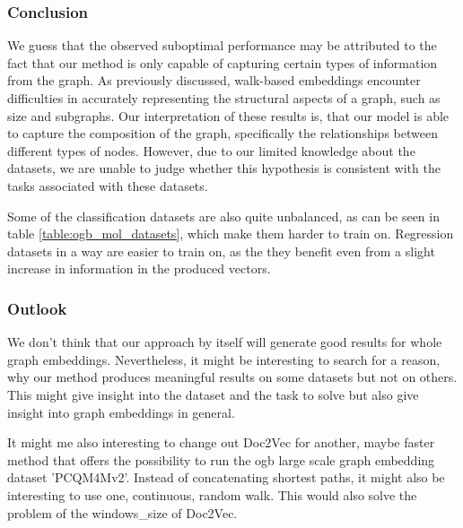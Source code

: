 \subsubsection{Conclusion}
We guess that the observed suboptimal performance may be attributed to the fact that our method is only capable of capturing certain types of information from the graph. As previously discussed, walk-based embeddings encounter difficulties in accurately representing the structural aspects of a graph, such as size and subgraphs. Our interpretation of these results is, that our model is able to capture the composition of the graph, specifically the relationships between different types of nodes. However, due to our limited knowledge about the datasets, we are unable to judge whether this hypothesis is consistent with the tasks associated with these datasets.

Some of the classification datasets are also quite unbalanced, as can be seen in table \ref{table:ogb_mol_datasets}, which make them harder to train on. Regression datasets in a way are easier to train on, as the they benefit even from a slight increase in information in the produced vectors.

\subsubsection{Outlook}
We don't think that our approach by itself will generate good results for whole graph embeddings. Nevertheless, it might be interesting to search for a reason, why our method produces meaningful results on some datasets but not on others. This might give insight into the dataset and the task to solve but also give insight into graph embeddings in general.

It might me also interesting to change out Doc2Vec for another, maybe faster method that offers the possibility to run the ogb large scale graph embedding dataset 'PCQM4Mv2'. Instead of concatenating shortest paths, it might also be interesting to use one, continuous, random walk. This would also solve the problem of the windows\_size of Doc2Vec.

